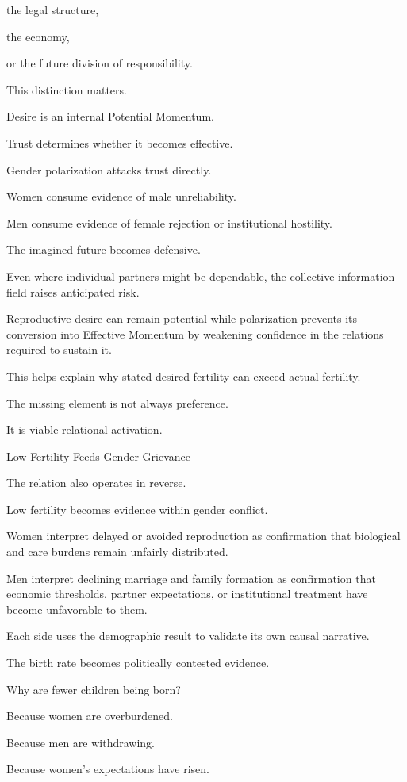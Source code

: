 the legal structure,

the economy,

or the future division of responsibility.

This distinction matters.

Desire is an internal Potential Momentum.

Trust determines whether it becomes effective.

Gender polarization attacks trust directly.

Women consume evidence of male unreliability.

Men consume evidence of female rejection or institutional hostility.

The imagined future becomes defensive.

Even where individual partners might be dependable, the collective information field raises anticipated risk.

Reproductive desire can remain potential while polarization prevents its conversion into Effective Momentum by weakening confidence in the relations required to sustain it.

This helps explain why stated desired fertility can exceed actual fertility.

The missing element is not always preference.

It is viable relational activation.

Low Fertility Feeds Gender Grievance

The relation also operates in reverse.

Low fertility becomes evidence within gender conflict.

Women interpret delayed or avoided reproduction as confirmation that biological and care burdens remain unfairly distributed.

Men interpret declining marriage and family formation as confirmation that economic thresholds, partner expectations, or institutional treatment have become unfavorable to them.

Each side uses the demographic result to validate its own causal narrative.

The birth rate becomes politically contested evidence.

Why are fewer children being born?

Because women are overburdened.

Because men are withdrawing.

Because women’s expectations have risen.

